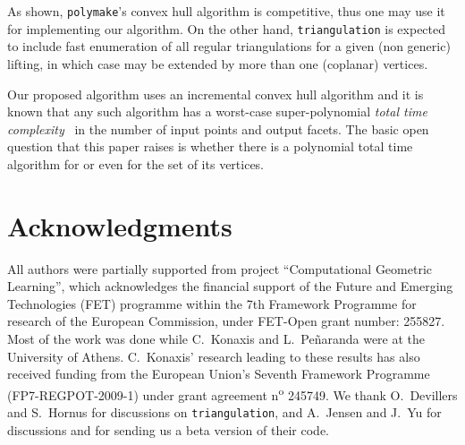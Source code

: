 \documentclass{article}
\begin{document}
As shown, {\tt polymake}'s convex hull algorithm is competitive,
thus one may use it for implementing our algorithm. 
On the other hand, {\tt triangulation} is expected to include fast
enumeration of all regular triangulations for a given (non generic)
lifting, in which case  may be extended by more
than one (coplanar) vertices.

Our proposed algorithm uses an incremental convex hull algorithm and it is
known that any such algorithm has a worst-case super-polynomial \emph{total time
complexity}~ in
the number of input points and output facets.
The basic open question that this paper raises is whether there is a polynomial
total time algorithm for  or even for the set of its vertices.

\section{Acknowledgments}
All authors were partially supported from project
``Computational Geometric Learning'', which acknowledges the
financial support of the Future and Emerging Technologies (FET)
programme within the 7th Framework Programme for research of
the European Commission, under FET-Open grant number: 255827.
Most of the work was done while C.~Konaxis and L.~Pe{\~n}aranda
were at the University of Athens.
C.~Konaxis' research leading to these results has also received
funding from the European Union's 
Seventh Framework Programme (FP7-REGPOT-2009-1) under grant agreement n\textsuperscript{o} 245749.
We thank O.~Devillers and S.~Hornus for discussions on
\texttt{triangulation}, and A.\ Jensen and J.~Yu for discussions 
and for sending us a beta version of their code.



\end{document}
